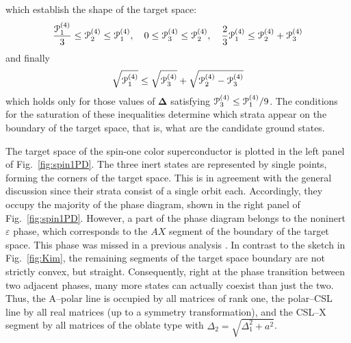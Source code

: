 \documentclass[final,2p,times,12pt,sort&compress]{elsarticle}
\newcommand\PP{\EuScript{P}}                %
\newcommand\ve{\varepsilon}
\newcommand\op{\mathbf\Delta}               %
\begin{document}
which establish the shape of the target space:
\begin{equation}
\frac{\PP^{(4)}_1}3\leq\PP^{(4)}_2\leq\PP^{(4)}_1,\quad
0\leq\PP^{(4)}_3\leq\PP^{(4)}_2,\quad
\frac23\PP^{(4)}_1\leq\PP^{(4)}_2+\PP^{(4)}_3
\end{equation}
and finally
\begin{equation}
\sqrt{\PP^{(4)}_1}\leq\sqrt{\PP^{(4)}_3}+\sqrt{\PP^{(4)}_2-\PP^{(4)}_3}
\end{equation}
which holds only for those values of $\op$ satisfying
$\PP^{(4)}_3\leq\PP^{(4)}_1/9$. The conditions for the saturation of these
inequalities determine which strata appear on the boundary of the target space,
that is, what are the candidate ground states.

The target space of the spin-one color superconductor is plotted in
the left panel of Fig.~\ref{fig:spin1PD}. The three inert states are represented
by single points, forming the corners of the target space. This is in
agreement with the general discussion since their strata consist of a single
orbit each. Accordingly, they occupy the majority of the phase diagram, shown in
the right panel of Fig.~\ref{fig:spin1PD}. However, a part of the phase diagram
belongs to the noninert $\ve$ phase, which corresponds to the $AX$ segment of
the boundary of the target space. This phase was missed in a previous analysis
\cite{Bailin:1983bm}. In contrast to the sketch in Fig.~\ref{fig:Kim}, the
remaining segments of the target space boundary are not strictly convex, but
straight. Consequently, right at the phase transition between two adjacent
phases, many more states can actually coexist than just the two. Thus, the
A--polar line is occupied by all matrices of rank one, the polar--CSL
line by all real matrices (up to a symmetry transformation), and the CSL--X
segment by all matrices of the oblate type with
$\Delta_2=\sqrt{\Delta_1^2+a^2}$.
\end{document}
